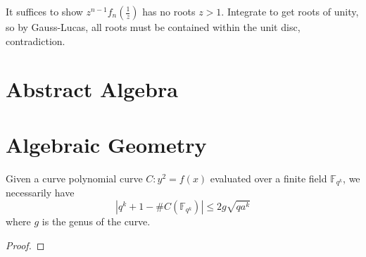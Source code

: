 \documentclass[11pt]{scrartcl}
\theoremstyle{plain} %
\theoremstyle{definition}
\theoremstyle{remark}
\theoremstyle{empty}
\theoremstyle{empty}
\theoremstyle{empty}
\theoremstyle{empty}
\theoremstyle{empty}
\theoremstyle{empty}
\theoremstyle{empty}
\begin{document}
\begin{solution}
  It suffices to show $z^{n-1}f_n(\frac{1}{z})$ has no roots $z > 1$. Integrate to get roots of unity, so by Gauss-Lucas, all roots must be contained within the unit disc, contradiction. 
\end{solution}


\section{Abstract Algebra}

\section{Algebraic Geometry}

\begin{theorem}
  
\end{theorem}


\begin{theorem}
  Given a curve polynomial curve $C: y^2 = f(x)$ evaluated over a finite field $\mathbb F_{q^k}$, we necessarily have \[|q^k+1 - \# C(\mathbb F_{q^k})| \le 2g\sqrt{qa^k}\] where $g$ is the genus of the curve. 
\end{theorem}

\begin{proof}
  
\end{proof}
\end{document}
